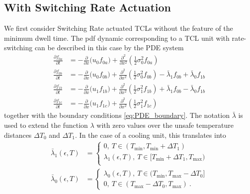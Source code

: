 \documentclass[submission,copyright,creativecommons]{eptcs}
\begin{document}
\subsection{With Switching Rate Actuation}

We first consider Switching Rate actuated TCLs without the feature of the minimum dwell time. The pdf dynamic corresponding to a TCL unit with rate-switching can be described in this case by the PDE system
\begin{subequations} 
\begin{align} \label{eq:dyn_eps} 
  \frac{ \partial f_{0a} }{ \partial t}  &= - \frac{\partial}{\partial x} \bigg( u_0 f_{0a} \bigg) +  \frac{\partial^2}{\partial x^2} \left( \frac{1}{2} \sigma_0^2 f_{0a} \right) \\
  \frac{ \partial f_{0b} }{ \partial t} &= - \frac{\partial}{\partial x} \bigg( u_0 f_{0b} \bigg) +  \frac{\partial^2}{\partial x^2} \left( \frac{1}{2} \sigma_0^2 f_{0b} \right)  - \bar{\lambda}_1 f_{0b} + \bar{ \lambda}_0 f_{1b} \label{eq:dyn_eps_0b} \\
  \frac{ \partial f_{1b} }{ \partial t} &= - \frac{\partial}{\partial x} \bigg( u_1 f_{1b} \bigg) +  \frac{\partial^2}{\partial x^2} \left( \frac{1}{2} \sigma_1^2 f_{1b} \right)  + \bar{\lambda}_1 f_{0b} - \bar{\lambda}_0 f_{1b}  \label{eq:dyn_eps_1b} \\
  \frac{ \partial f_{1c} }{ \partial t} &= - \frac{\partial}{\partial x} \bigg( u_1 f_{1c} \bigg) +  \frac{\partial^2}{\partial x^2} \left( \frac{1}{2} \sigma_1^2 f_{1c} \right)  
\end{align}
\end{subequations}
together with the boundary conditions \eqref{eq:PDE_boundary}. The notation $\bar{\lambda}$ is used to extend the function $\lambda$ with zero values over the unsafe temperature distances $\Delta T_0$ and $\Delta T_1$.  In the case of a cooling unit, this translates into 
\begin{align}
 \bar{\lambda}_1 (\epsilon, T) &= \begin{cases}  
										0, ~T \in ( T_{\min}, T_{\min} + \Delta T_1 ) \\
                             						\lambda_1(\epsilon, T), ~T \in [ T_{\min}+ \Delta T_1, T_{\max} ) \\
                                                       \end{cases} \\
 \bar{\lambda}_0 (\epsilon, T) &= \begin{cases}  
										\lambda_0(\epsilon, T), ~T \in ( T_{\min} , T_{\max} - \Delta T_0 ] \\
										0, ~T \in ( T_{\max} -\Delta T_{0}, T_{\max} )~.
                                                       \end{cases} 
\end{align}
\end{document}
